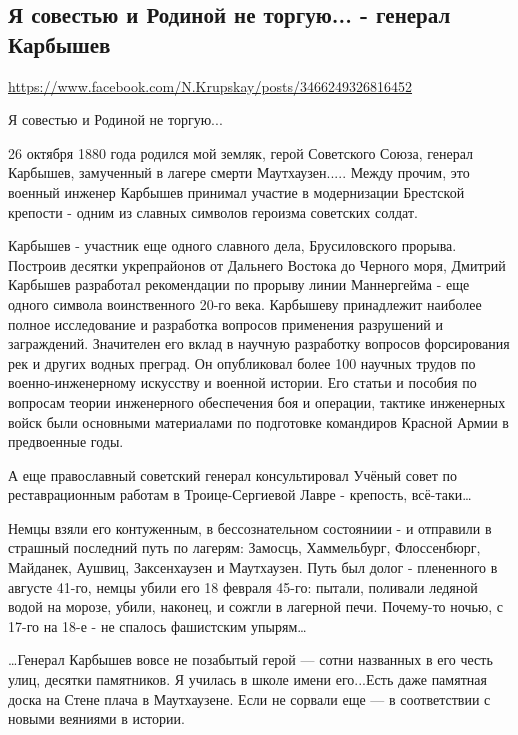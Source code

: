  
 

\subsection{Я совестью и Родиной не торгую... - генерал Карбышев}
\label{sec:26_10_2020.fb.ljalja_krupskaja.1.karbyshev}

\url{https://www.facebook.com/N.Krupskay/posts/3466249326816452}

Я совестью и Родиной не торгую...

26 октября 1880 года родился мой земляк, герой Советского Союза, генерал
Карбышев, замученный в лагере смерти Маутхаузен.....  Между прочим, это военный
инженер Карбышев принимал участие в модернизации Брестской крепости - одним из
славных символов героизма советских солдат. 

Карбышев - участник еще одного славного дела, Брусиловского прорыва. Построив
десятки укрепрайонов от Дальнего Востока до Черного моря, Дмитрий Карбышев
разработал рекомендации по прорыву линии Маннергейма - еще одного символа
воинственного 20-го века.  Карбышеву принадлежит наиболее полное исследование и
разработка вопросов применения разрушений и заграждений. Значителен его вклад в
научную разработку вопросов форсирования рек и других водных преград. Он
опубликовал более 100 научных трудов по военно-инженерному искусству и военной
истории. Его статьи и пособия по вопросам теории инженерного обеспечения боя и
операции, тактике инженерных войск были основными материалами по подготовке
командиров Красной Армии в предвоенные годы. 

А еще православный советский генерал консультировал Учёный совет по
реставрационным работам в Троице-Сергиевой Лавре - крепость, всё-таки… 

Немцы взяли его контуженным, в бессознательном состояниии - и отправили в
страшный последний путь по лагерям: Замосць, Хаммельбург, Флоссенбюрг,
Майданек, Аушвиц, Заксенхаузен и Маутхаузен. Путь был долог - плененного в
августе 41-го, немцы убили его 18 февраля 45-го: пытали, поливали ледяной водой
на морозе, убили, наконец, и сожгли в лагерной печи. Почему-то ночью, с 17-го
на 18-е - не спалось фашистским упырям… 

…Генерал Карбышев вовсе не позабытый герой --- сотни названных в его честь улиц,
десятки памятников. Я училась в школе имени его...Есть даже памятная доска на
Стене плача в Маутхаузене. Если не сорвали еще --- в соответствии с новыми
веяниями в истории.
